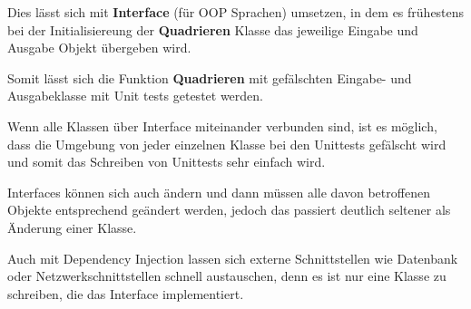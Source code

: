 Dies lässt sich mit \textbf{Interface} (für OOP Sprachen) umsetzen, 
in dem es frühestens bei der Initialisiereung der \textbf{Quadrieren} 
Klasse das jeweilige Eingabe und Ausgabe Objekt übergeben wird.

Somit lässt sich die Funktion \textbf{Quadrieren} mit gefälschten Eingabe- und Ausgabeklasse mit Unit tests getestet werden.

Wenn alle Klassen über Interface miteinander verbunden sind, 
ist es möglich, dass die Umgebung von jeder einzelnen Klasse bei den Unittests gefälscht
wird und somit das Schreiben von Unittests sehr einfach wird. 

Interfaces können sich auch ändern und dann müssen alle davon betroffenen Objekte entsprechend geändert werden, 
jedoch das passiert deutlich seltener als Änderung einer Klasse.

Auch mit Dependency Injection lassen sich externe Schnittstellen wie Datenbank oder Netzwerkschnittstellen schnell austauschen, 
denn es ist nur eine Klasse zu schreiben, die das Interface implementiert.